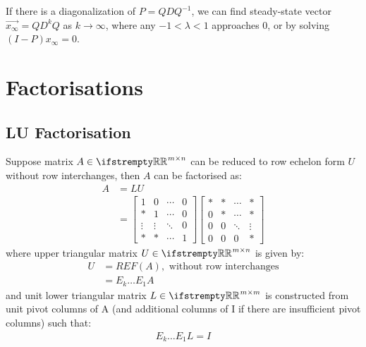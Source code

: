 \documentclass[12pt, a4paper]{article}
\begin{document}
\begin{multicols*}{3}
If there is a diagonalization of $P = QDQ^{-1}$, we can find steady-state vector $\vec{x_{\infty}} = QD^{k}Q$ as $k\rightarrow\infty$, where any $-1 < \lambda < 1$ approaches 0, or by solving $(I-P)x_{\infty} =0$.
\colbreak
\section{Factorisations}

\subsection{LU Factorisation}
Suppose matrix $A \in \RR^{m{\times}n}$ can be reduced to row echelon form $U$ without row interchanges, then $A$ can be factorised as:
\begin{align*}
  A &= LU \\
    &= \begin{bmatrix}1 & 0 & \cdots & 0 \\ * & 1 & \cdots & 0 \\ \vdots & \vdots & \ddots & 0 \\ * & * & \cdots & 1\end{bmatrix}
       \begin{bmatrix}* & * & \cdots & * \\ 0 & * & \cdots & * \\ 0 & 0 & \ddots & \vdots \\ 0 & 0 & 0 & *\end{bmatrix}
\end{align*}
where upper triangular matrix $U \in \RR^{m{\times}n}$ is given by:
\begin{align*}
  U &= REF(A), \text{ without row interchanges} \\
    &= E_k{\ldots}E_1A
\end{align*}
and unit lower triangular matrix $L \in \RR^{m{\times}m}$ is constructed from unit pivot columns of A (and additional columns of I if there are insufficient pivot columns) such that:
\begin{align*}
  E_k{\ldots}E_1L = I
\end{align*}


\end{multicols*}
\end{document}
